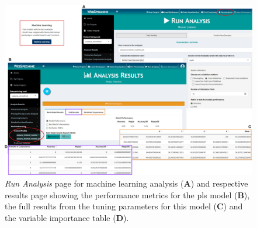 \begin{figure}[H]
	\centering
	\includegraphics[width=1\linewidth]{Imagens/CassavaPPD/ml}
	\caption{\textit{Run Analysis} page for machine learning analysis (\textbf{A}) and respective results page showing the performance metrics for the \gls{pls} model (\textbf{B}), the full results from the tuning parameters for this model (\textbf{C}) and the variable importance table (\textbf{D}).}
	\label{cassava_machine_learning}
\end{figure}










